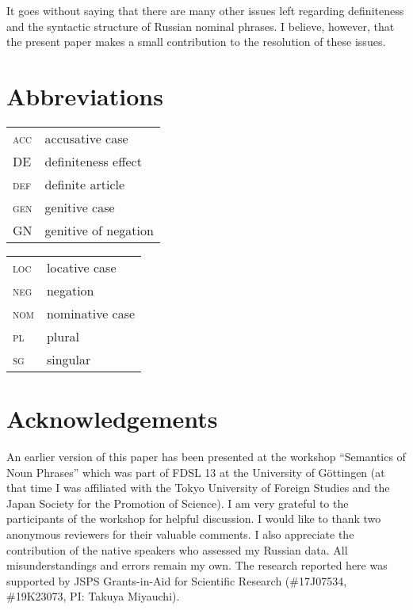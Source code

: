 \documentclass[output=paper,
colorlinks,
citecolor=brown,
newtxmath
]{langscibook}
\begin{document}
It goes without saying that there are many other issues left regarding definiteness and the syntactic structure of Russian nominal phrases. I believe, however, that the present paper makes a small contribution to the resolution of these issues.

\section*{Abbreviations}
\begin{tabularx}{.5\textwidth}{@{}lX@{}}
\textsc{acc} & accusative case\\
DE & definiteness effect\\
\textsc{def} & definite article\\
\textsc{gen} & genitive case\\
GN & genitive of negation\\
\end{tabularx}%
\begin{tabularx}{.5\textwidth}{@{}lX@{}}
\textsc{loc} & locative case\\
\textsc{neg} & negation\\
\textsc{nom} & nominative case\\
\textsc{pl} & plural\\
\textsc{sg} & singular\\
\end{tabularx}

\section*{Acknowledgements}
An earlier version of this paper has been presented at the workshop ``Semantics of Noun Phrases'' which was part of FDSL 13 at the University of Göttingen (at that time I was affiliated with the Tokyo University of Foreign Studies and the Japan Society for the Promotion of Science). I am very grateful to the participants of the workshop for helpful discussion. I would like to thank two anonymous reviewers for their valuable comments. I also appreciate the contribution of the native speakers who assessed my Russian data. All misunderstandings and errors remain my own. The research reported here was supported by JSPS Grants-in-Aid for Scientific Research (\#17J07534, \#19K23073, PI: Takuya Miyauchi).

\sloppy
\printbibliography[heading=subbibliography,notkeyword=this]
\end{document}
